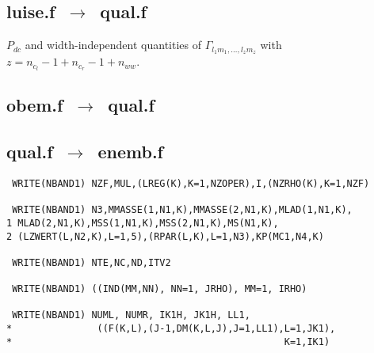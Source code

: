 \documentclass[onecolumn,preprint,superscriptaddress,nofootinbib,notitlepage,10pt,linenumbers]{revtex4-1}
\begin{document}
\newpage



\newpage



\subsection*{luise.f~$\to$~qual.f}
$P_{dc}$ and width-independent quantities of $\Gamma_{l_1m_1,\ldots,l_zm_z}$ with
$z=n_{c_l}-1+n_{c_r}-1+n_{ww}$.

\subsection*{obem.f~$\to$~qual.f}


\subsection*{qual.f~$\to$~enemb.f}

\begin{lstlisting}
 WRITE(NBAND1) NZF,MUL,(LREG(K),K=1,NZOPER),I,(NZRHO(K),K=1,NZF)

 WRITE(NBAND1) N3,MMASSE(1,N1,K),MMASSE(2,N1,K),MLAD(1,N1,K),
1 MLAD(2,N1,K),MSS(1,N1,K),MSS(2,N1,K),MS(N1,K),
2 (LZWERT(L,N2,K),L=1,5),(RPAR(L,K),L=1,N3),KP(MC1,N4,K)

 WRITE(NBAND1) NTE,NC,ND,ITV2

 WRITE(NBAND1) ((IND(MM,NN), NN=1, JRHO), MM=1, IRHO)

 WRITE(NBAND1) NUML, NUMR, IK1H, JK1H, LL1,
*               ((F(K,L),(J-1,DM(K,L,J),J=1,LL1),L=1,JK1),
*                                                K=1,IK1)
\end{lstlisting}

\nocite{*}

\end{document}
